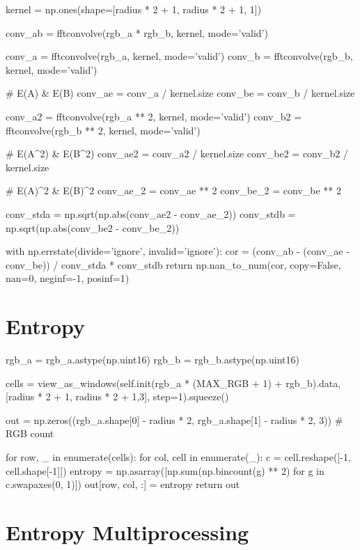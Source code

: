 \documentclass[article,oneside]{memoir}
\begin{document}
\begin{python}
kernel = np.ones(shape=[radius * 2 + 1, radius * 2 + 1, 1])

conv_ab = fftconvolve(rgb_a * rgb_b, kernel, mode='valid')

conv_a = fftconvolve(rgb_a, kernel, mode='valid')
conv_b = fftconvolve(rgb_b, kernel, mode='valid')

# E(A) & E(B)
conv_ae = conv_a / kernel.size
conv_be = conv_b / kernel.size

conv_a2 = fftconvolve(rgb_a ** 2, kernel, mode='valid')
conv_b2 = fftconvolve(rgb_b ** 2, kernel, mode='valid')

# E(A^2) & E(B^2)
conv_ae2 = conv_a2 / kernel.size
conv_be2 = conv_b2 / kernel.size

# E(A)^2 & E(B)^2
conv_ae_2 = conv_ae ** 2
conv_be_2 = conv_be ** 2

conv_stda = np.sqrt(np.abs(conv_ae2 - conv_ae_2))
conv_stdb = np.sqrt(np.abs(conv_be2 - conv_be_2))

with np.errstate(divide='ignore', invalid='ignore'):
    cor = (conv_ab - (conv_ae - conv_be)) / conv_stda * conv_stdb
    return np.nan_to_num(cor, copy=False, nan=0, neginf=-1, posinf=1)
\end{python}


\section{Entropy}

\begin{python}
rgb_a = rgb_a.astype(np.uint16)
rgb_b = rgb_b.astype(np.uint16)

cells = view_as_windows(self.init(rgb_a * (MAX_RGB + 1) + rgb_b).data,
                        [radius * 2 + 1, radius * 2 + 1,3],
                        step=1).squeeze()

out = np.zeros((rgb_a.shape[0] - radius * 2,
                rgb_a.shape[1] - radius * 2,
                3))  # RGB count

for row, _ in enumerate(cells):
    for col, cell in enumerate(_):
        c = cell.reshape([-1, cell.shape[-1]])
        entropy = np.asarray([np.sum(np.bincount(g) ** 2)
                              for g in c.swapaxes(0, 1)])
        out[row, col, :] = entropy
return out
\end{python}

\section{Entropy Multiprocessing}
\end{document}
